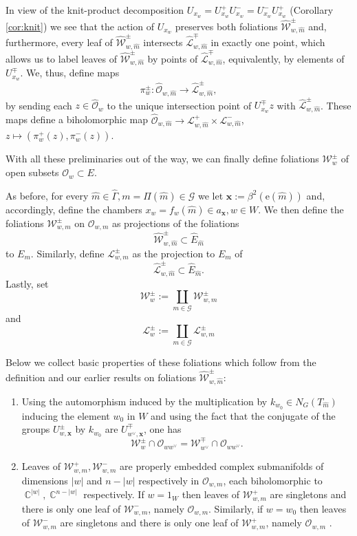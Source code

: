 \documentclass[12pt]{amsbook}%
\theoremstyle{definition}
\theoremstyle{remark}
\numberwithin{section}{chapter}
\numberwithin{subsection}{section}
\numberwithin{figure}{chapter}
\DeclareMathOperator{\C}{\mathbb{C}}
\def\cO{{\mathscr{O}}}
\def\cW{{\mathscr{W}}}
\def\bx{\mathbf{x}}
\def\re{\mathrm{e}}
\def\Ga{\Gamma}
\def\cG{{\mathscr{G}}}
\def\cL{{\mathscr{L}}}
\begin{document}
{{In view of  the knit-product decomposition $U_{x_w}= U^+_{x_w} U^-_{x_w}= U^-_{x_w} U^+_{x_w}$ 
(Corollary \ref{cor:knit}) we see that the action of $U_{x_w}$ preserves both foliations 
$\hat{\cW}^\pm_{w,\hat{m}}$ and, furthermore, every leaf of $\hat{\cW}^\pm_{w,\hat{m}}$ intersects $\hat{\cL}^\mp_{w,\hat{m}}$ 
in exactly one point, which allows us to label leaves of $\hat{\cW}^\pm_{w,\hat{m}}$ by points of 
$\hat{\cL}^\mp_{w,\hat{m}}$, equivalently, by elements of $U^\mp_{x_w}$.  We, thus, define maps
\begin{equation}\label{eq:pm-proj} 
\pi_{w}^{\pm}: \hat{\cO}_{w, \hat{m}}\to \hat{\cL}^\pm_{w,\hat{m}},
\end{equation}
by sending each $z\in \hat{\cO}_{w}$ to the unique intersection point of $U^\mp_{x_w} z$ with  $\hat{\cL}^\pm_{w,\hat{m}}$. These maps define a biholomorphic map 
$\hat{\cO}_{w,\hat{m}}\to \cL^+_{w,\hat{m}}\times \cL^-_{w,\hat{m}}$, $z\mapsto (\pi_{w}^+(z), \pi_{w}^-(z))$. 


\medskip
With all these preliminaries out of the way, we can finally  define foliations $\cW^\pm_w$ of open subsets $\cO_w\subset E$. 

\medskip 
As before, for every $\hat m\in \widehat\Ga, m=\Pi(\hat{m})\in \cG$ we let $\bx:= \beta^2(\re(\hat m))$ and, accordingly, define the chambers 
$x_w=f_w(\hat m)\in a_{\bx}, w\in W$.  We then
define the foliations $\cW^\pm_{w,m}$
 on $\cO_{w,m}$  as projections of   the foliations 
$$
  \hat{\cW}^\pm_{w,\hat{m}}\subset \widehat{E}_{\hat m}
$$
to $E_m$. Similarly, define $\cL^\pm_{w,m}$ as the projection to $E_m$ of 
$$
 \hat{\cL}^\pm_{w,\hat{m}}\subset \widehat{E}_{\hat m}. 
$$
Lastly, set
$$
\cW^\pm_{w}:= \coprod_{m\in \cG} \cW^\pm_{w,m}  
$$
and
$$
\cL^\pm_{w}:= \coprod_{m\in \cG} \cL^\pm_{w,m} 
$$

Below we collect basic properties of these foliations which follow from the definition and 
our earlier results on foliations $\hat{\cW}^\pm_{w,\hat{m}}$:

\begin{enumerate}
 \item Using the automorphism induced by the multiplication by $k_{w_0} \in N_G(T_{\hat{m}})$ inducing the element $w_0$ in $W$ and using the fact that the conjugate of the groups $U_{w,\bx}^{\pm}$ by $k_{w_0}$ are $U_{w^{\vee},\bx}^{\mp}$, one has  
$$
\cW^\pm_{w}\cap \cO_{ww^\vee} = \cW^\mp_{w^\vee}\cap \cO_{ww^\vee}. 
$$

\item Leaves of $\cW^+_{w,m}, \cW^-_{w,m}$ are properly embedded complex submanifolds of dimensions 
$|w|$ and $n-|w|$ respectively in  $\cO_{w,m}$, each biholomorphic to $\C^{|w|}, \C^{n-|w|}$ respectively. 
If $w=1_W$ then leaves of $\cW^+_{w,m}$ are singletons and there is only one leaf of $\cW^-_{w,m}$, namely 
$\cO_{w,m}$. Similarly, if $w=w_0$ then leaves of $\cW^-_{w,m}$ are singletons and there is only one leaf of $\cW^+_{w,m}$, namely 
$\cO_{w,m}$ .


\end{enumerate}}}
\end{document}
